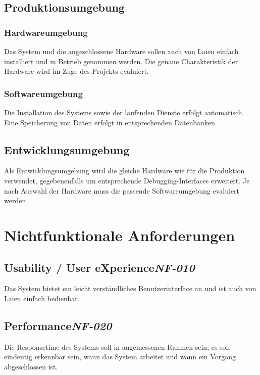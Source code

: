 \section{Produktionsumgebung}

\subsection{Hardwareumgebung}

Das System und die angeschlossene Hardware sollen auch von Laien einfach installiert und in Betrieb genommen werden.
Die genaue Charakteristik der Hardware wird im Zuge des Projekts evaluiert.


\subsection{Softwareumgebung}

Die Installation des Systems sowie der laufenden Dienste erfolgt automatisch.
Eine Speicherung von Daten erfolgt in entsprechenden Datenbanken.


\section{Entwicklungsumgebung}

Als Entwicklungsumgebung wird die gleiche Hardware wie für die Produktion verwendet, gegebenenfalls um entsprechende Debugging-Interfaces erweitert.
Je nach Auswahl der Hardware muss die passende Softwareumgebung evaluiert werden


\chapter{Nichtfunktionale Anforderungen}

\section[Usability / User eXperience]{Usability / User eXperience\hfill \emph{NF-010}}

Das System bietet ein leicht verständliches Benutzerinterface an und ist auch von Laien einfach bedienbar.

\section[Performance]{Performance\hfill \emph{NF-020}}

Die Responsetime des Systems soll in angemessenen Rahmen sein; es soll eindeutig erkennbar sein, wann das System arbeitet und wann ein Vorgang abgeschlossen ist.

